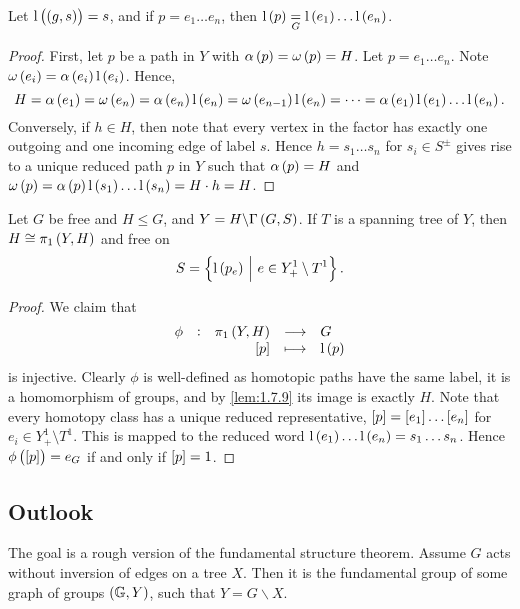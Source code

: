 Let $ \l\br{\br{g, s}} = s $, and if $ p = e_1 \dots e_n $, then $ \l\br{p} \underset{G}{=} \l\br{e_1} \dots \l\br{e_n} $.

\begin{proof}
First, let $ p $ be a path in $ Y $ with $ \alpha\br{p} = \omega\br{p} = H $. Let $ p = e_1 \dots e_n $. Note $ \omega\br{e_i} = \alpha\br{e_i}\l\br{e_i} $. Hence,
$$ H = \alpha\br{e_1} = \omega\br{e_n} = \alpha\br{e_n}\l\br{e_n} = \omega\br{e_{n - 1}}\l\br{e_n} = \dots = \alpha\br{e_1}\l\br{e_1} \dots \l\br{e_n}. $$
Conversely, if $ h \in H $, then note that every vertex in the factor has exactly one outgoing and one incoming edge of label $ s $. Hence $ h = s_1 \dots s_n $ for $ s_i \in S^\pm $ gives rise to a unique reduced path $ p $ in $ Y $ such that $ \alpha\br{p} = H $ and $ \omega\br{p} = \alpha\br{p}\l\br{s_1} \dots \l\br{s_n} = H \cdot h = H $.
\end{proof}

\begin{theorem}
Let $ G $ be free and $ H \le G $, and $ Y = H \backslash \Gamma\br{G, S} $. If $ T $ is a spanning tree of $ Y $, then $ H \cong \pi_1\br{Y, H} $ and free on
$$ S = \cbr{\l\br{p_e} \st e \in Y_+^1 \setminus T^1}. $$
\end{theorem}

\begin{proof}
We claim that
$$ \function[\phi]{\pi_1\br{Y, H}}{G}{\sbr{p}}{\l\br{p}} $$
is injective. Clearly $ \phi $ is well-defined as homotopic paths have the same label, it is a homomorphism of groups, and by \ref{lem:1.7.9} its image is exactly $ H $. Note that every homotopy class has a unique reduced representative, $ \sbr{p} = \sbr{e_1} \dots \sbr{e_n} $ for $ e_i \in Y_+^1 \setminus T^1 $. This is mapped to the reduced word $ \l\br{e_1} \dots \l\br{e_n} = s_1 \dots s_n $. Hence $ \phi\br{\sbr{p}} = e_G $ if and only if $ \sbr{p} = 1 $.
\end{proof}

\subsection{Outlook}


The goal is a rough version of the fundamental structure theorem. Assume $ G $ acts without inversion of edges on a tree $ X $. Then it is the fundamental group of some graph of groups $ \br{\GG, Y} $, such that $ Y = G \backslash X $.

